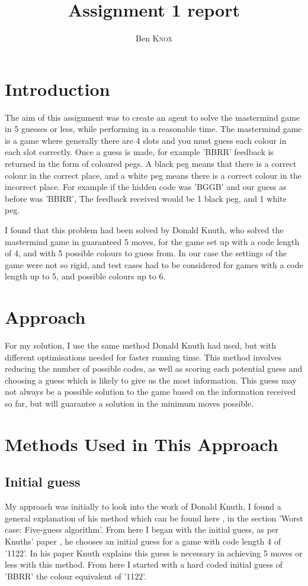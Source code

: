 \documentclass[12pt]{article}
\title{Assignment 1 report}
\author{Ben \textsc{Knox}}
\begin{document}
\maketitle


\section{Introduction}
 
The aim of this assignment was to create an agent to solve the mastermind game in 5 guesses or less, while performing in a reasonable time. The mastermind game is a game where generally there are 4 slots and you must guess each colour in each slot correctly. Once a guess is made, for example 'BBRR' feedback is returned in the form of coloured pegs. A black peg means that there is a correct colour in the correct place, and a white peg means there is a correct colour in the incorrect place. For example if the hidden code was 'BGGB' and our guess as before was 'BBRR', The feedback received would be 1 black peg, and 1 white peg. 

I found that this problem had been solved by Donald Knuth, who solved the mastermind game in guaranteed 5 moves, for the game set up with a code length of 4, and with 5 possible colours to guess from. In our case the settings of the game were not so rigid, and test cases had to be considered for games with a code length up to 5, and possible colours up to 6.  

\section{Approach}

For my solution, I use the same method Donald Knuth had used, but with different optimisations needed for faster running time. This method involves reducing the number of possible codes, as well as scoring each potential guess and choosing a guess which is likely to give us the most information. This guess may not always be a possible solution to the game based on the information received so far, but will guarantee a solution in the minimum moves possible.

\section{Methods Used in This Approach}
 
\subsection{Initial guess}
My approach was initially to look into the work of Donald Knuth, I found a general explanation of his method which can be found here \cite{mastermind wikipedia}, in the section 'Worst case: Five-guess algorithm'. From here I began with the initial guess, as per Knuths' paper \cite{Knuths Paper}, he chooses an initial guess for a game with code length 4 of '1122'. In his paper Knuth explains this guess is necessary in achieving 5 moves or less with this method. From here I started with a hard coded initial guess of 'BBRR' the colour equivalent of '1122'. 
\end{document}
